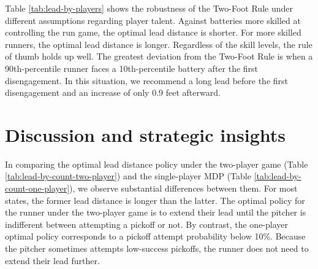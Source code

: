 \documentclass[11pt]{article}
\newcommand{\tablepath}{tables/}
\newcommand{\inputtable}[1]{}
\begin{document}
      \begin{table}
        \centering
        \inputtable{lead_by_outs_one_player.tex}
        \caption{
          \it The optimal lead distance (in feet) by outs and prior disengagements under the single-player MDP, assuming an average runner on first base facing an average battery (pitcher and catcher) with an 0-0 count and third base empty.
        }
        \label{tab:lead-by-outs-one-player}
      \end{table}
  
      Table \ref{tab:lead-by-players} shows the robustness of the Two-Foot Rule under different assumptions regarding player talent. Against batteries more skilled at controlling the run game, the optimal lead distance is shorter. For more skilled runners, the optimal lead distance is longer. Regardless of the skill levels, the rule of thumb holds up well. The greatest deviation from the Two-Foot Rule is when a 90th-percentile runner faces a 10th-percentile battery after the first disengagement. In this situation, we recommend a long lead before the first disengagement and an increase of only 0.9 feet afterward.
    
      \begin{table}
        \centering
        \inputtable{lead_by_players.tex}
        \caption{
          \it Optimal lead distance (in feet) by battery/runner skill and prior disengagements, for an 0-0 count with no outs and third base empty. For example, the hypothetical 90$^{th}$-percentile battery represents the 90$^{th}$ percentile at attempting pickoffs, successfully executing pickoffs, suppressing stolen base attempts, and catching would-be base stealers.
        }
        \label{tab:lead-by-players}
      \end{table}

  \section{Discussion and strategic insights}
  \label{sec:discussion}

    In comparing the optimal lead distance policy under the two-player game (Table \ref{tab:lead-by-count-two-player}) and the single-player MDP (Table \ref{tab:lead-by-count-one-player}), we observe substantial differences between them. For most states, the former lead distance is longer than the latter. The optimal policy for the runner under the two-player game is to extend their lead until the pitcher is indifferent between attempting a pickoff or not. By contrast, the one-player optimal policy corresponds to a pickoff attempt probability below 10\%. Because the pitcher sometimes attempts low-success pickoffs, the runner does not need to extend their lead further.
\end{document}
